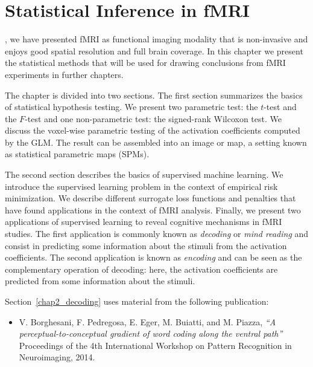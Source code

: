 \chapter{Statistical Inference in fMRI}\label{chap:stats_fmri}
\label{Chapter_2}



\vspace*{\fill}
, we have presented fMRI as functional imaging modality that is non-invasive and enjoys good spatial resolution and full brain coverage. In this chapter we present the statistical methods that will be used for drawing conclusions from fMRI experiments in further chapters. 


The chapter is divided into two sections. The first section summarizes the basics of statistical hypothesis testing. We present two parametric test: the $t$-test and the $F$-test and one non-parametric test: the signed-rank Wilcoxon test. We discuss the voxel-wise parametric testing of the activation coefficients computed by the GLM. The result can be assembled into an image or map, a setting known as statistical parametric maps (SPMs).


The second section describes the basics of supervised machine learning. We introduce the supervised learning problem in the context of empirical risk minimization. We describe different surrogate loss functions and penalties that have found applications in the context of fMRI analysis. Finally, we present two applications of supervised learning to reveal cognitive mechanisms in fMRI studies. The first application is commonly known as \emph{decoding} or \emph{mind reading} and consist in predicting some information about the stimuli from the activation coefficients. The second application is known as \emph{encoding} and can be seen as the complementary operation of decoding: here, the activation coefficients are predicted from some information about the stimuli.


\hspace{20pt}
\begin{shaded}
Section~\ref{chap2_decoding} uses material from the following publication:
\begin{itemize}
\item V. Borghesani, F. Pedregosa, E. Eger, M. Buiatti, and M. Piazza, \emph{“A perceptual-to-conceptual gradient of word coding along the ventral path”} Proceedings of the 4th International Workshop on Pattern Recognition in Neuroimaging, 2014.
\end{itemize}
\end{shaded}
\vspace*{\fill}


